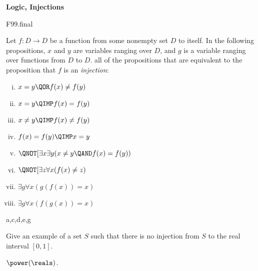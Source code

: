 \examspace
\begin{problem} \textbf{Logic, Injections}
\begin{staffnotes}
F99.final
\end{staffnotes}

\bparts

\ppart Let $f:D \to D$ be a function from some nonempty set $D$ to itself.
In the following propositions, $x$ and $y$ are variables ranging over
$D$, and $g$ is a variable ranging over functions from $D$ to
$D$.   all of the propositions that
are equivalent to the proposition that $f$ is an
\emph{injection}:

\begin{enumerate}[(i)]
\item $x =y \QOR f(x) \neq f(y)$
\item $x =y \QIMP f(x) = f(y)$
\item $x \neq y \QIMP f(x) \neq f(y)$
\item $f(x) =f(y) \QIMP x = y$
\item $\QNOT[\exists x\exists y(x \neq y \QAND f(x)= f(y))$
\item $\QNOT[\exists z \forall x(f(x) \neq z)$
\item $\exists g \forall x (g(f(x))=x)$
\item $\exists g \forall x (f(g(x))=x)$
\end{enumerate}

\begin{solution}
a,c,d,e,g
\end{solution}

\ppart Give an example of a set $S$ such that there is no injection
from $S$ to the real interval $[0,1]$.

\begin{solution}
$\power(\reals)$.
\end{solution}

\eparts

\end{problem}

